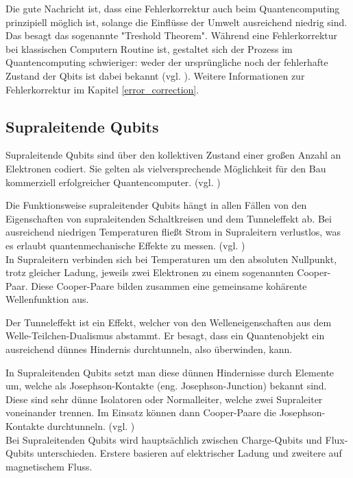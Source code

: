 Die gute Nachricht ist, dass eine Fehlerkorrektur auch beim Quantencomputing prinzipiell möglich ist, solange die Einflüsse der Umwelt ausreichend niedrig sind. Das besagt das sogenannte "Treshold Theorem". Während eine Fehlerkorrektur bei klassischen Computern Routine ist, gestaltet sich der Prozess im Quantencomputing schwieriger: weder der ursprüngliche noch der fehlerhafte Zustand der Qbits ist dabei bekannt (vgl. \cite[Ch. 1]{mermin_quantum_2012}). 
Weitere Informationen zur Fehlerkorrektur im Kapitel \ref{error_correction}. \\

\subsection{Supraleitende Qubits }
\label{subsec: Supraleitende Qubits}

Supraleitende Qubits sind über den kollektiven Zustand einer großen Anzahl an Elektronen codiert.
Sie gelten als vielversprechende Möglichkeit für den Bau kommerziell erfolgreicher Quantencomputer. (vgl. \cite[Ch. 15.1]{bergou_quantum_2021})


Die Funktionsweise supraleitender Qubits hängt in allen Fällen von den Eigenschaften von supraleitenden Schaltkreisen und dem Tunneleffekt ab. Bei ausreichend niedrigen Temperaturen fließt Strom in Supraleitern verlustlos, was es erlaubt quantenmechanische Effekte zu messen. (vgl. \cite[Ch. 10.6]{homeister_quantum_2022-1})\\

In Supraleitern verbinden sich bei Temperaturen um den absoluten Nullpunkt, trotz gleicher Ladung, jeweils zwei Elektronen zu einem sogenannten Cooper-Paar. Diese Cooper-Paare bilden zusammen eine gemeinsame kohärente Wellenfunktion aus.


Der Tunneleffekt ist ein Effekt, welcher von den Welleneigenschaften aus dem Welle-Teilchen-Dualismus abstammt.
Er besagt, dass ein Quantenobjekt ein ausreichend dünnes Hindernis durchtunneln, also überwinden, kann.


In Supraleitenden Qubits setzt man diese dünnen Hindernisse durch Elemente um, welche als Josephson-Kontakte (eng. Josephson-Junction) bekannt sind.
Diese sind sehr dünne Isolatoren oder Normalleiter, welche zwei Supraleiter voneinander trennen.
Im Einsatz können dann Cooper-Paare die Josephson-Kontakte durchtunneln. (vgl. \cite[Ch. 10.6]{homeister_quantum_2022-1})\\

Bei Supraleitenden Qubits wird hauptsächlich zwischen Charge-Qubits und Flux-Qubits unterschieden. Erstere basieren auf elektrischer Ladung und zweitere auf magnetischem Fluss.


